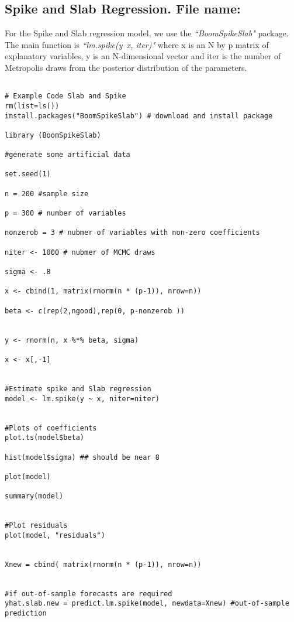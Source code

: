 \documentclass[12pt]{article}
\begin{document}
\subsection{Spike and Slab Regression. File name: \color{blue}{SpikeSlab.R}}

For the Spike and Slab regression model, we use the \emph{``BoomSpikeSlab"} package. The main function is \emph{``lm.spike(y~x, iter)" }where x is an N by p matrix of explanatory variables, y is an N-dimensional vector and iter is the number of Metropolis draws from the posterior distribution of the parameters.

\begin{lstlisting}[title=\textbf{Slab and Spike regression.}]

# Example Code Slab and Spike
rm(list=ls())
install.packages("BoomSpikeSlab") # download and install package

library (BoomSpikeSlab)

#generate some artificial data

set.seed(1)

n = 200 #sample size

p = 300 # number of variables

nonzerob = 3 # nubmer of variables with non-zero coefficients

niter <- 1000 # nubmer of MCMC draws

sigma <- .8

x <- cbind(1, matrix(rnorm(n * (p-1)), nrow=n))

beta <- c(rep(2,ngood),rep(0, p-nonzerob ))


y <- rnorm(n, x %*% beta, sigma)

x <- x[,-1]


#Estimate spike and Slab regression
model <- lm.spike(y ~ x, niter=niter)


#Plots of coefficients
plot.ts(model$beta)

hist(model$sigma) ## should be near 8

plot(model)

summary(model)


#Plot residuals
plot(model, "residuals")


Xnew = cbind( matrix(rnorm(n * (p-1)), nrow=n))


#if out-of-sample forecasts are required
yhat.slab.new = predict.lm.spike(model, newdata=Xnew) #out-of-sample prediction


\end{lstlisting}
\end{document}
